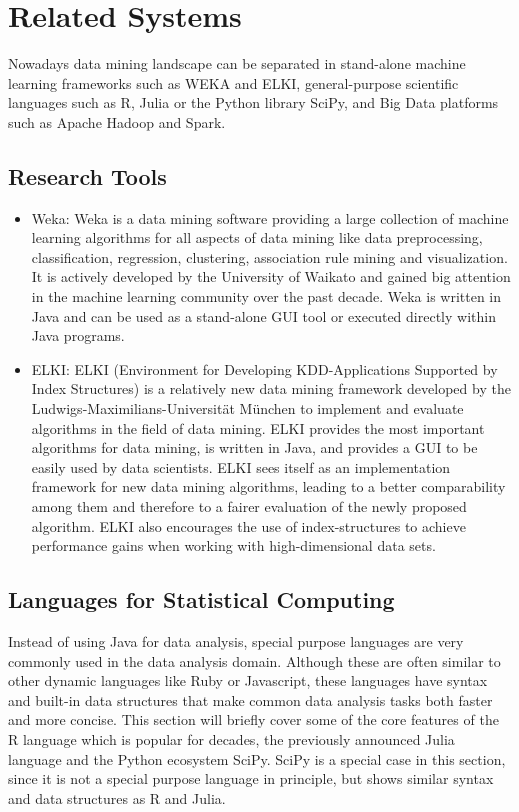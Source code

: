 \chapter{Related Systems}\label{chapter:related}

Nowadays data mining landscape can be separated in stand-alone machine learning frameworks such as WEKA and ELKI, general-purpose scientific languages such as R, Julia or the Python library SciPy, and Big Data platforms such as Apache Hadoop and Spark.

\section{Research Tools}
\begin{itemize}
\item Weka: Weka is a data mining software providing a large collection of machine learning algorithms for all aspects of data mining like data preprocessing, classification, regression, clustering, association rule mining and visualization. It is  actively developed by the University of Waikato and gained big attention in the machine learning community over the past decade. Weka is written in Java and can be used as a stand-alone GUI tool or executed directly within Java programs. 

\item ELKI: ELKI (Environment for Developing KDD-Applications Supported by Index Structures) is a relatively new data mining framework developed by the Ludwigs-Maximilians-Universität München to implement and evaluate algorithms in the field of data mining. ELKI provides the most important algorithms for data mining, is written in Java, and provides a GUI to be easily used by data scientists.  ELKI sees itself as an implementation framework for new data mining algorithms, leading to a better comparability among them and therefore to a fairer evaluation of the newly proposed algorithm. ELKI also encourages the use of index-structures to achieve performance gains when working with high-dimensional data sets.

\end{itemize}

\section{Languages for Statistical Computing}

Instead of using Java for data analysis, special purpose languages are very commonly used in the data analysis domain. Although these are often similar to other dynamic languages like Ruby or Javascript, these languages have syntax and built-in data structures that make common data analysis tasks both faster and more concise. This section will briefly cover some of the core features of the R language which is popular for decades, the previously announced Julia language and the Python ecosystem SciPy. SciPy is a special case in this section, since it is not a special purpose language in principle, but shows similar syntax and data structures as R and Julia.

